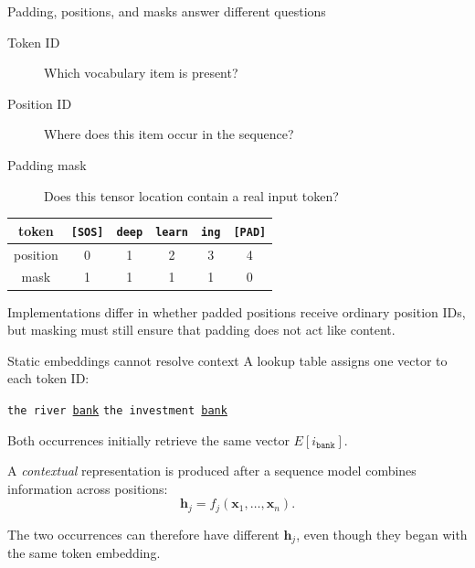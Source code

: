 \begin{frame}{Padding, positions, and masks answer different questions}
  \begin{description}
    \item[Token ID] Which vocabulary item is present?
    \item[Position ID] Where does this item occur in the sequence?
    \item[Padding mask] Does this tensor location contain a real input token?
  \end{description}

  \begin{center}
    \begin{tabular}{c|ccccc}
      token & \texttt{[SOS]} & \texttt{deep} & \texttt{learn} &
        \texttt{ing} & \texttt{[PAD]} \\ \hline
      position & 0 & 1 & 2 & 3 & 4 \\
      mask & 1 & 1 & 1 & 1 & 0
    \end{tabular}
  \end{center}

  Implementations differ in whether padded positions receive ordinary position
  IDs, but masking must still ensure that padding does not act like content.
\end{frame}

\begin{frame}{Static embeddings cannot resolve context}
  A lookup table assigns one vector to each token ID:
  \begin{center}
    \texttt{the river \underline{bank}}
    \qquad
    \texttt{the investment \underline{bank}}
  \end{center}
  Both occurrences initially retrieve the same vector $E[i_{\texttt{bank}}]$.

  A \emph{contextual} representation is produced after a sequence model combines
  information across positions:
  \[
    \mathbf{h}_j
      = f_j(\mathbf{x}_1,\ldots,\mathbf{x}_n).
  \]

  The two occurrences can therefore have different $\mathbf{h}_j$, even though
  they began with the same token embedding.
\end{frame}

